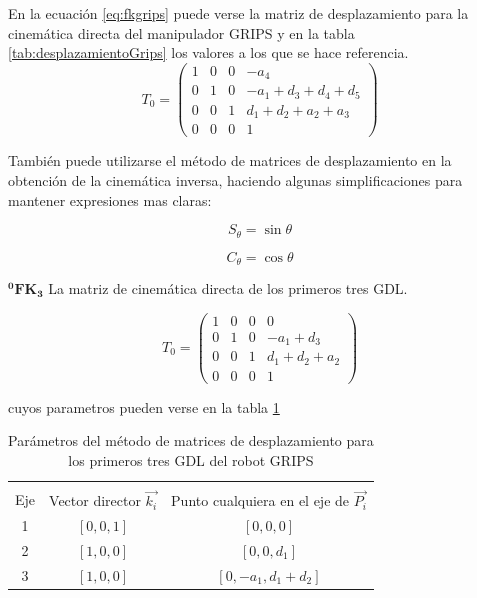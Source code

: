 En la ecuación \ref{eq:fkgrips} puede verse la matriz de desplazamiento para la cinemática directa del manipulador GRIPS y en la tabla \ref{tab:desplazamientoGrips} los valores a los que se hace referencia.
\begin{equation}
\label{eq:fkgrips}
T_0=\begin{pmatrix}
1 & 0 & 0 & -a_4\\
0 & 1 & 0 & -a_1+d_3+d_4+d_5\\
0 & 0 & 1 & d_1 +d_2+a_2+a_3\\
0 & 0 & 0 & 1  
\end{pmatrix}
\end{equation}




También puede utilizarse el método de matrices de desplazamiento en la obtención de la cinemática inversa, haciendo algunas simplificaciones para mantener expresiones mas claras:

$$
S_\theta=\sin\theta
$$

$$
C_\theta=\cos\theta
$$

$\mathbf{^{0}FK_{3}}$ La matriz de cinemática directa de los primeros tres GDL.

\begin{equation}
T_0=\begin{pmatrix}
1 & 0 & 0 & 0\\
0 & 1 & 0 & -a_1+d_3\\
0 & 0 & 1 & d_1+d_2+a_2\\
0 & 0 & 0 & 1  
\end{pmatrix}
\end{equation}


cuyos parametros pueden verse en la tabla \ref{tab:f3gdl}

\begin{table}[htb!]
\centering
\label{tab:f3gdl}
\caption{Parámetros del método de matrices de desplazamiento para los primeros tres GDL del robot GRIPS}
\begin{tabular}{c c c}
\hline \\
Eje & Vector director $\vec{k_i}$ & Punto cualquiera en el eje de $\vec{P_i}$ \\
1				& $[0,0,1] $ &  $[0,0,0]$\\
2				& $[1,0,0] $ &  $[0,0,d_1]$\\
3				& $[1,0,0] $ &  $[0,-a_1,d_1+d_2]$\\
\hline
\end{tabular}
\end{table}


